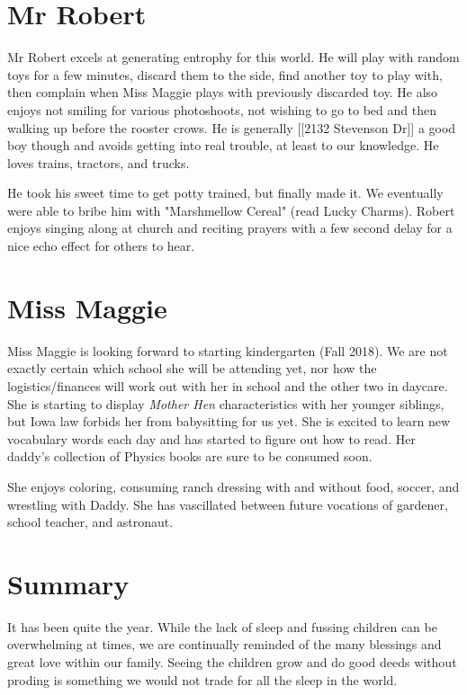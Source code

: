 \documentclass[letterpaper,11pt]{article}
\begin{document}
\begin{multicols}{2}
\section{Mr Robert}

Mr Robert excels at generating entrophy for this world.  He will play with
random toys for a few minutes, discard them to the side, find another toy to play with,
then complain when Miss Maggie plays with previously discarded toy.  He also
enjoys not smiling for various photoshoots, not wishing to go to bed and then
walking up before the rooster crows.  He is generally [[2132 Stevenson Dr]] a
good boy though and avoids getting into real trouble, at least to our knowledge.  He loves trains,
tractors, and trucks.

He took his sweet time to get potty trained, but finally made it.  We eventually
were able to bribe him with "Marshmellow Cereal" (read Lucky Charms). Robert
enjoys singing along at church and reciting prayers with a few second delay for
a nice echo effect for others to hear.

\section{Miss Maggie}

Miss Maggie is looking forward to starting kindergarten (Fall 2018).  We
are not exactly certain which school she will be attending yet, nor how the
logistics/finances will work out with her in school and the other two in
daycare.  She is starting to display \textit{Mother Hen} characteristics with
her younger siblings, but Iowa law forbids her from babysitting for us yet.  She is
excited to learn new vocabulary words each day and has started to figure out
how to read.  Her daddy's collection of Physics books are sure to be consumed
soon.

She enjoys coloring, consuming ranch dressing with and without food, soccer, and
wrestling with Daddy.  She has vascillated between future vocations of gardener,
school teacher, and astronaut.

\section{Summary}

It has been quite the year.  While the lack of sleep and fussing children can be
overwhelming at times, we are continually reminded of the many blessings and
great love within our family.  Seeing the children grow and do good deeds
without proding is something we would not trade for all the sleep in the world.



\end{multicols}
\end{document}
